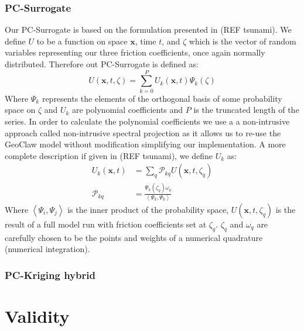 \documentclass[12pt,a4paper]{article}
\begin{document}
\subsubsection{PC-Surrogate}
\noindent
Our PC-Surrogate is based on the formulation presented in (REF tsunami). We define $U$ to be a function on space $\bm{x}$, time $t$, and $\zeta$ which is the vector of random variables representing our three friction coefficients, once again normally distributed. Therefore out PC-Surrogate is defined as:
\begin{equation}
	U(\bm{x},t,\zeta)=\sum_{k=0}^{P}U_k(\bm{x},t)\Psi_k(\zeta)
\end{equation}
Where $\Psi_k$ represents the elements of the orthogonal basis of some probability space on $\zeta$ and $U_k$ are polynomial coefficients and $P$ is the truncated length of the series. In order to calculate the polynomial coefficients we use a a non-intrusive approach called non-intrusive spectral projection as it allows us to re-use the GeoClaw model without modification simplifying our implementation. A more complete description if given in (REF tsunami), we define $U_k$ as:
\begin{align}
	U_k(\bm{x},t) &= \sum_{q}\mathcal{P}_{kq}U(\bm{x},t,\zeta_q) \\
	\mathcal{P}_{kq} &= \frac{\Psi_k(\zeta_q)\omega_q}{\left<\Psi_k, \Psi_k \right>}
\end{align}
Where $\left<\Psi_i,\Psi_j \right>$ is the inner product of the probability space, $U(\bm{x},t,\zeta_q)$ is the result of a full model run with friction coefficients set at $\zeta_q$. $\zeta_q$ and $\omega_q$ are carefully chosen to be the points and weights of a numerical quadrature (numerical integration).
\subsubsection{PC-Kriging hybrid}
\noindent
\section{Validity} \label{sec:val}


\end{document}
